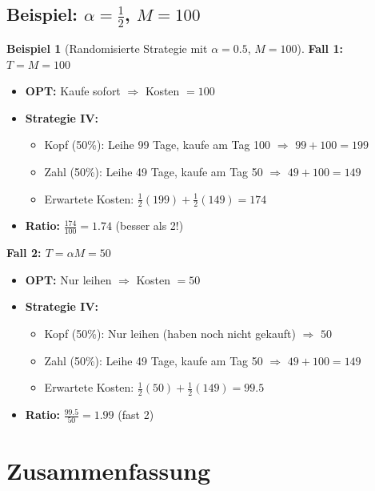\documentclass[12pt,a4paper]{article}
\theoremstyle{definition}
\newtheorem{beispiel}{Beispiel}
\begin{document}
\subsection{Beispiel: $\alpha = \frac{1}{2}$, $M = 100$}

\begin{beispiel}[Randomisierte Strategie mit $\alpha = 0.5$, $M = 100$]

\textbf{Fall 1: $T = M = 100$}
\begin{itemize}
    \item \textbf{OPT:} Kaufe sofort $\Rightarrow$ Kosten $= 100$
    \item \textbf{Strategie IV:}
    \begin{itemize}
        \item Kopf (50\%): Leihe 99 Tage, kaufe am Tag 100 $\Rightarrow$ $99 + 100 = 199$
        \item Zahl (50\%): Leihe 49 Tage, kaufe am Tag 50 $\Rightarrow$ $49 + 100 = 149$
        \item Erwartete Kosten: $\frac{1}{2}(199) + \frac{1}{2}(149) = 174$
    \end{itemize}
    \item \textbf{Ratio:} $\frac{174}{100} = 1.74$ (besser als 2!)
\end{itemize}

\textbf{Fall 2: $T = \alpha M = 50$}
\begin{itemize}
    \item \textbf{OPT:} Nur leihen $\Rightarrow$ Kosten $= 50$
    \item \textbf{Strategie IV:}
    \begin{itemize}
        \item Kopf (50\%): Nur leihen (haben noch nicht gekauft) $\Rightarrow$ $50$
        \item Zahl (50\%): Leihe 49 Tage, kaufe am Tag 50 $\Rightarrow$ $49 + 100 = 149$
        \item Erwartete Kosten: $\frac{1}{2}(50) + \frac{1}{2}(149) = 99.5$
    \end{itemize}
    \item \textbf{Ratio:} $\frac{99.5}{50} = 1.99$ (fast 2)
\end{itemize}
\end{beispiel}

\section{Zusammenfassung}
\end{document}
